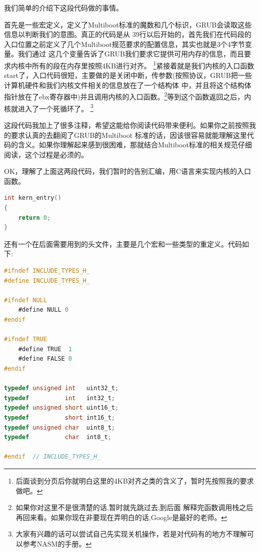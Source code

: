 \par 我们简单的介绍下这段代码做的事情。
\par 首先是一些宏定义，定义了Multiboot标准的魔数和几个标识，GRUB会读取这些信息以判断我们的意图。真正的代码是从\allowbreak
39行以后开始的，首先我们在代码段的入口位置之前定义了几个Multiboot规范要求的配置信息，其实也就是3个4字节变量。我们通过\allowbreak
这几个变量告诉了GRUB我们要求它提供可用内存的信息，而且要求内核中所有的段在内存里按照4KB进行对齐。\allowbreak
\footnote{后面谈到分页后你就明白这里的4KB对齐之类的含义了，暂时先按照我的要求做吧。}紧接着就是我们内核的入口函数\allowbreak
start了，入口代码很短，主要做的是关闭中断，传参数(按照协议，GRUB把一些计算机硬件和我们内核文件相关的信息放在了一个结构体\allowbreak
中，并且将这个结构体指针放在了ebx寄存器中)并且调用内核的入口函数。\footnote{如果你对这里不是很清楚的话,暂时就先跳过去,到后面\allowbreak
解释完函数调用栈之后再回来看。如果你现在非要现在弄明白的话,Google是最好的老师。}等到这个函数返回之后，内核就进入了一个死循环了。\allowbreak
\footnote{大家有兴趣的话可以尝试自己先实现关机操作，若是对代码有的地方不理解可以参考NASM的手册。}

\par 这段代码我加上了很多注释，希望这能给你阅读代码带来便利。如果你之前按照我的要求认真的去翻阅了GRUB的Multiboot\allowbreak
标准的话，因该很容易就能理解这里代码的含义。如果你理解起来感到很困难，那就结合Multiboot标准的相关规范仔细阅读，这个过程是必须的。

\par OK，理解了上面这两段代码，我们暂时的告别汇编，用C语言来实现内核的入口函数。

\begin{lstlisting}[language = C, caption = init/entry.c]
int kern_entry()
{
	return 0;
}
\end{lstlisting} 

\par 还有一个在后面需要用到的头文件，主要是几个宏和一些类型的重定义。代码如下:

\begin{lstlisting}[language = C, caption = include/types.h]
#ifndef INCLUDE_TYPES_H_
#define INCLUDE_TYPES_H_

#ifndef NULL
	#define NULL 0
#endif

#ifndef TRUE
	#define TRUE  1
	#define FALSE 0
#endif

typedef unsigned int   uint32_t;
typedef          int   int32_t;
typedef unsigned short uint16_t;
typedef          short int16_t;
typedef unsigned char  uint8_t;
typedef          char  int8_t;

#endif 	// INCLUDE_TYPES_H_
\end{lstlisting}

